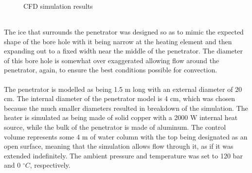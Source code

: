 \\
\begin{figure}[htb]
	\centering
	\\
	\\
	\caption{CFD simulation results}
	\label{fig:cfd}
\end{figure}
\\
The ice that surrounds the penetrator was designed so as to mimic the expected shape of the bore hole with it being narrow at the heating element and then expanding out to a fixed width near the middle of the penetrator. The diameter of this bore hole is somewhat over exaggerated allowing flow around the penetrator, again, to ensure the best conditions possible for convection.
\\
\\
The penetrator is modelled as being 1.5 m long with an external diameter of 20 cm. The internal diameter of the penetrator model is 4 cm, which was chosen because the much smaller diameters resulted in breakdown of the simulation. The heater is simulated as being made of solid copper with a 2000 W internal heat source, while the bulk of the penetrator is made of aluminum. The control volume represents some 4 m of water column with the top being designated as an open surface, meaning that the simulation allows flow through it, as if it was extended indefinitely. The ambient pressure and temperature was set to 120 bar and 0 $^\circ C$, respectively.
